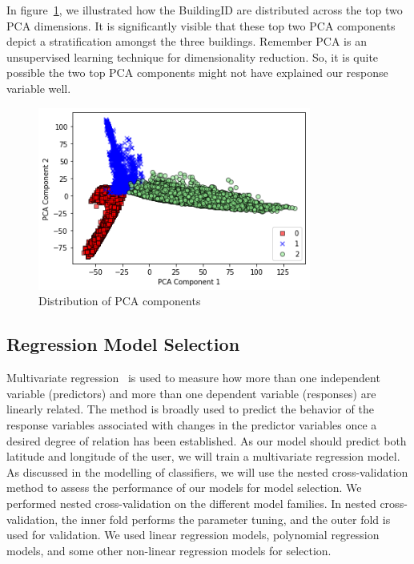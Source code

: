 \documentclass[a4paper,singleside,12pt]{report} %
\begin{document}
				In figure~\ref{fig4.10}, we illustrated how the BuildingID are distributed across the top two PCA dimensions. It is significantly visible that these top two PCA components depict a stratification amongst the three buildings. 
				Remember PCA is an unsupervised learning technique for dimensionality reduction. 
				So, it is quite possible the two top PCA components might not have explained our response variable well.
				
				
				
				
				\begin{figure}[!htb]
				\centerline{\includegraphics[width=0.8\textwidth]{./figures/pca components distribution.png}}
				\caption{Distribution of PCA components}
				\label{fig4.10}
				\end{figure}

			\subsection{Regression Model Selection}
				Multivariate regression~\cite{alexopoulos2010introduction,izenman2013multivariate} is used to measure how more than one independent variable (predictors) and more than one dependent variable (responses) are linearly related.
				The method is broadly used to predict the behavior of the response variables associated with changes in the predictor variables once a desired degree of relation has been established. 
				As our model should predict both latitude and longitude of the user, we will train a multivariate regression model.
				As discussed in the modelling of classifiers, we will use the nested cross-validation method to assess the performance of our models for model selection. 
				We performed nested cross-validation on the different model families. 
				In nested cross-validation, the inner fold performs the parameter tuning, and the outer fold is used for validation. 
				We used linear regression models, polynomial regression models, and some other non-linear regression models for selection.
				 
\end{document}
